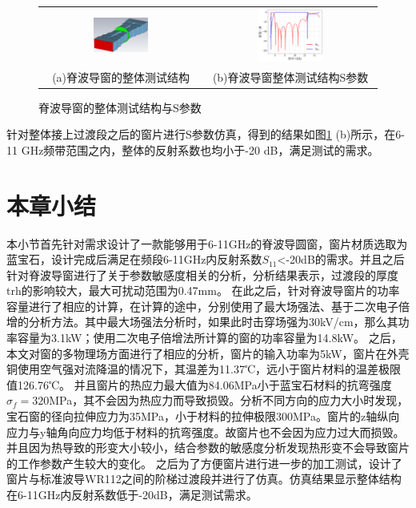 \documentclass[master]{thesis-uestc}
\begin{document}
\begin{figure}[!htb]
    \small
    \centering
    \begin{tabular}{@{\ }c@{\ }c}
        \includegraphics[width=0.35\textwidth]{pic/chapter3/脊波导窗整体测试结构.png} & 
        \hspace{5pt}
        \includegraphics[width=0.4\textwidth]{pic/chapter3/脊波导窗整体S参数.png}     \\
        \mbox{\small (a)脊波导窗的整体测试结构}                                                                               & 
        \mbox{\small (b)脊波导窗整体测试结构S参数}                                                                                  \\
    \end{tabular}
    \caption{脊波导窗的整体测试结构与S参数}
    \label{fig:脊波导窗的整体测试结构与S参数}
\end{figure}

针对整体接上过渡段之后的窗片进行S参数仿真，得到的结果如图\ref{fig:脊波导窗的整体测试结构与S参数} (b)所示，在6-11 GHz频带范围之内，整体的反射系数也均小于-20 dB，满足测试的需求。


\section{本章小结}
本小节首先针对需求设计了一款能够用于6-11GHz的脊波导圆窗，窗片材质选取为蓝宝石，设计完成后满足在频段6-11GHz内反射系数\(S_{11}\)<-20dB的需求。并且之后针对脊波导窗进行了关于参数敏感度相关的分析，分析结果表示，过渡段的厚度trh的影响较大，最大可扰动范围为0.47mm。
在此之后，针对脊波导窗片的功率容量进行了相应的计算，在计算的途中，分别使用了最大场强法、基于二次电子倍增的分析方法。其中最大场强法分析时，如果此时击穿场强为30kV/cm，那么其功率容量为3.1kW；使用二次电子倍增法所计算的窗的功率容量为14.8kW。
之后，本文对窗的多物理场方面进行了相应的分析，窗片的输入功率为5kW，窗片在外壳铜使用空气强对流降温的情况下，其温差为11.37℃，远小于窗片材料的温差极限值126.76℃。
并且窗片的热应力最大值为84.06MPa小于蓝宝石材料的抗弯强度\(\sigma_f = 320\)MPa，其不会因为热应力而导致损毁。分析不同方向的应力大小时发现，宝石窗的径向拉伸应力为35MPa，小于材料的拉伸极限300MPa。窗片的z轴纵向应力与y轴角向应力均低于材料的抗弯强度。故窗片也不会因为应力过大而损毁。
并且因为热导致的形变大小较小，结合参数的敏感度分析发现热形变不会导致窗片的工作参数产生较大的变化。
之后为了方便窗片进行进一步的加工测试，设计了窗片与标准波导WR112之间的阶梯过渡段并进行了仿真。仿真结果显示整体结构在6-11GHz内反射系数低于-20dB，满足测试需求。
\end{document}
